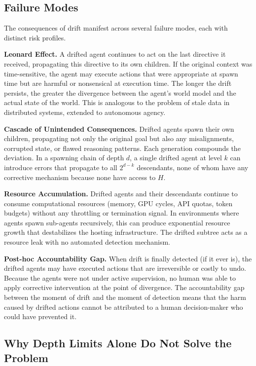 \subsection{Failure Modes}

The consequences of drift manifest across several failure modes, each with distinct risk profiles.

\textbf{Leonard Effect.} A drifted agent continues to act on the last directive it received, propagating this directive to its own children. If the original context was time-sensitive, the agent may execute actions that were appropriate at spawn time but are harmful or nonsensical at execution time. The longer the drift persists, the greater the divergence between the agent's world model and the actual state of the world. This is analogous to the problem of stale data in distributed systems, extended to autonomous agency.

\textbf{Cascade of Unintended Consequences.} Drifted agents spawn their own children, propagating not only the original goal but also any misalignments, corrupted state, or flawed reasoning patterns. Each generation compounds the deviation. In a spawning chain of depth $d$, a single drifted agent at level $k$ can introduce errors that propagate to all $2^{d-k}$ descendants, none of whom have any corrective mechanism because none have access to $H$.

\textbf{Resource Accumulation.} Drifted agents and their descendants continue to consume computational resources (memory, GPU cycles, API quotas, token budgets) without any throttling or termination signal. In environments where agents spawn sub-agents recursively, this can produce exponential resource growth that destabilizes the hosting infrastructure. The drifted subtree acts as a resource leak with no automated detection mechanism.

\textbf{Post-hoc Accountability Gap.} When drift is finally detected (if it ever is), the drifted agents may have executed actions that are irreversible or costly to undo. Because the agents were not under active supervision, no human was able to apply corrective intervention at the point of divergence. The accountability gap between the moment of drift and the moment of detection means that the harm caused by drifted actions cannot be attributed to a human decision-maker who could have prevented it.

\subsection{Why Depth Limits Alone Do Not Solve the Problem}

